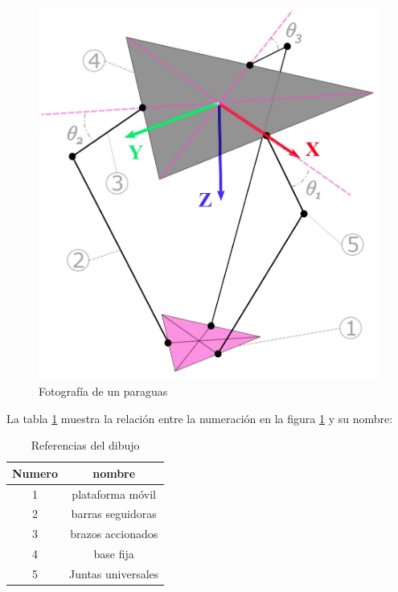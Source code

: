         \begin{figure}[htb]
             \centering
             \includegraphics[width=0.62\linewidth]{Main/Chapter4/Images4/DIBUJO18.jpg}
              \caption{Fotografía de un paraguas}
              \label{f:Cap4_Metodo_A_Modelacion_Cinematica_Posicion_7}
        \end{figure}
 
          La tabla \ref{tab:cap4_tabla_5} muestra la relación entre la numeración en la figura \ref{f:Cap4_Metodo_A_Modelacion_Cinematica_Posicion_7}  y su nombre:
        
        \begin{table}[h]
            \centering
            \begin{tabular}{c c}
            \hline
                \textbf{Numero}& \textbf{nombre} \\ 
            \hline             \hline
             1 & plataforma móvil \\
            \hline
             2 & barras seguidoras \\
            \hline
             3 & brazos accionados \\
            \hline
             4 & base fija\\
            \hline
             5 & Juntas universales \\
             \hline
            \end{tabular}
           \caption{Referencias del dibujo}
           \label{tab:cap4_tabla_5}
        \end{table}
        
